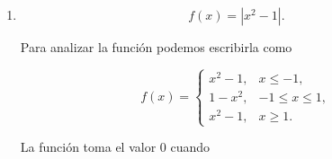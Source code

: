 \documentclass[12pt]{article}
\begin{document}
\begin{enumerate}[label=\alph*.-]
\begin{enumerate}[label=\roman*.-]
    Por lo tanto,

    \[
    \boxed{
    \text{Máximo absoluto: }(0,1)
    }
    \]

    El valor mínimo de la función seno es $-1$, que en este intervalo
    se alcanza en
    \[
    t=-\pi
    \qquad\text{y}\qquad
    t=\pi.
    \]

    Por lo tanto,

    \[
    \boxed{
    \text{Mínimos absolutos: }
    (-\pi,-1),\ (\pi,-1)
    }
    \]

    Además,

    \[
    \boxed{\text{Máximo local: }(0,1)}
    \]

    y

    \[
    \boxed{
    \text{Mínimos locales: }
    (-\pi,-1),\ (\pi,-1)
    }
    \]

				\newpage

    \item
    \[
    f(x)=|x^2-1|.
    \]

    \begin{center}
    \end{center}

    Para analizar la función podemos escribirla como

    \[
    f(x)=
    \begin{cases}
    x^2-1, & x\leq -1,\\
    1-x^2, & -1\leq x\leq1,\\
    x^2-1, & x\geq1.
    \end{cases}
    \]

    La función toma el valor $0$ cuando


\end{enumerate}
\end{enumerate}
\end{document}
